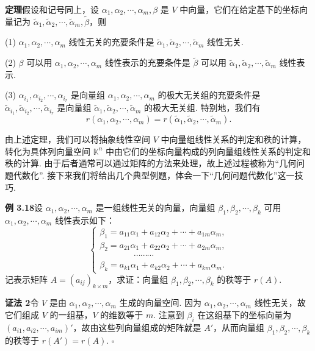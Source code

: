 \documentclass[UTF8, 12pt, fontset=fandol, oneside]{ctexart}
\begin{document}
\noindent\textbf{定理}\quad 假设和记号同上，设 $\alpha_1,\alpha_2,\cdots,\alpha_m,\beta$ 是 $V$ 中向量，它们在给定基下的坐标向量记为 $\widetilde\alpha_1,\widetilde\alpha_2,\cdots,\widetilde\alpha_m,\widetilde\beta$，则

(1) $\alpha_1,\alpha_2,\cdots,\alpha_m$ 线性无关的充要条件是 $\widetilde\alpha_1,\widetilde\alpha_2,\cdots,\widetilde\alpha_m$ 线性无关.

(2) $\beta$ 可以用 $\alpha_1,\alpha_2,\cdots,\alpha_m$ 线性表示的充要条件是 $\widetilde\beta$ 可以用 $\widetilde\alpha_1,\widetilde\alpha_2,\cdots,\widetilde\alpha_m$ 线性表示.

(3) $\alpha_{i_1},\alpha_{i_2},\cdots,\alpha_{i_r}$ 是向量组 $\alpha_1,\alpha_2,\cdots,\alpha_m$ 的极大无关组的充要条件是 $\widetilde\alpha_{i_1},\widetilde\alpha_{i_2},\cdots,\widetilde\alpha_{i_r}$ 是向量组 $\widetilde\alpha_1,\widetilde\alpha_2,\cdots,\widetilde\alpha_m$ 的极大无关组. 特别地，我们有
\[
r(\alpha_1,\alpha_2,\cdots,\alpha_m)=r(\widetilde\alpha_1,\widetilde\alpha_2,\cdots,\widetilde\alpha_m).
\]

由上述定理，我们可以将抽象线性空间 $V$ 中向量组线性关系的判定和秩的计算，转化为具体列向量空间 $\mathbb{K}^n$ 中由它们的坐标向量构成的列向量组线性关系的判定和秩的计算. 由于后者通常可以通过矩阵的方法来处理，故上述过程被称为“几何问题代数化”. 接下来我们将给出几个典型例题，体会一下“几何问题代数化”这一技巧.

\noindent\textbf{例 3.18}\quad 设 $\alpha_1,\alpha_2,\cdots,\alpha_m$ 是一组线性无关的向量，向量组 $\beta_1,\beta_2,\cdots,\beta_k$ 可用 $\alpha_1,\alpha_2,\cdots,\alpha_m$ 线性表示如下：
\[
\left\{
\begin{array}{l}
\beta_1=a_{11}\alpha_1+a_{12}\alpha_2+\cdots+a_{1m}\alpha_m,\\
\beta_2=a_{21}\alpha_1+a_{22}\alpha_2+\cdots+a_{2m}\alpha_m,\\
\hspace{4em}\cdots\cdots\cdots\\
\beta_k=a_{k1}\alpha_1+a_{k2}\alpha_2+\cdots+a_{km}\alpha_m.
\end{array}
\right.
\]
记表示矩阵 $A=(a_{ij})_{k\times m}$，求证：向量组 $\beta_1,\beta_2,\cdots,\beta_k$ 的秩等于 $r(A)$.

\noindent\textbf{证法 2}\quad 令 $V$ 是由 $\alpha_1,\alpha_2,\cdots,\alpha_m$ 生成的向量空间. 因为 $\alpha_1,\alpha_2,\cdots,\alpha_m$ 线性无关，故它们组成 $V$ 的一组基，$V$ 的维数等于 $m$. 注意到 $\beta_i$ 在这组基下的坐标向量为 $(a_{i1},a_{i2},\cdots,a_{im})'$，故由这些列向量组成的矩阵就是 $A'$，从而向量组 $\beta_1,\beta_2,\cdots,\beta_k$ 的秩等于 $r(A')=r(A)$. $\square$
\end{document}
